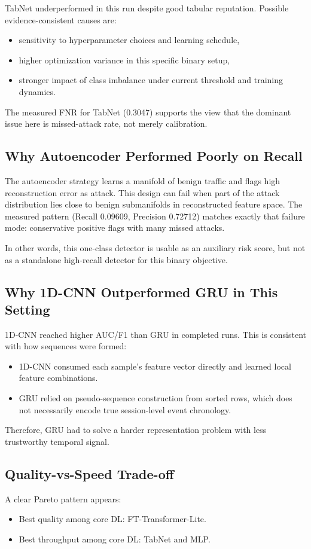 \documentclass[10pt,journal]{IEEEtran}
\begin{document}
TabNet underperformed in this run despite good tabular reputation. Possible evidence-consistent causes are:
\begin{itemize}
\item sensitivity to hyperparameter choices and learning schedule,
\item higher optimization variance in this specific binary setup,
\item stronger impact of class imbalance under current threshold and training dynamics.
\end{itemize}

The measured FNR for TabNet (0.3047) supports the view that the dominant issue here is missed-attack rate, not merely calibration.

\subsection{Why Autoencoder Performed Poorly on Recall}
The autoencoder strategy learns a manifold of benign traffic and flags high reconstruction error as attack. This design can fail when part of the attack distribution lies close to benign submanifolds in reconstructed feature space. The measured pattern (Recall 0.09609, Precision 0.72712) matches exactly that failure mode: conservative positive flags with many missed attacks.

In other words, this one-class detector is usable as an auxiliary risk score, but not as a standalone high-recall detector for this binary objective.

\subsection{Why 1D-CNN Outperformed GRU in This Setting}
1D-CNN reached higher AUC/F1 than GRU in completed runs. This is consistent with how sequences were formed:
\begin{itemize}
\item 1D-CNN consumed each sample's feature vector directly and learned local feature combinations.
\item GRU relied on pseudo-sequence construction from sorted rows, which does not necessarily encode true session-level event chronology.
\end{itemize}

Therefore, GRU had to solve a harder representation problem with less trustworthy temporal signal.

\subsection{Quality-vs-Speed Trade-off}
A clear Pareto pattern appears:
\begin{itemize}
\item Best quality among core DL: FT-Transformer-Lite.
\item Best throughput among core DL: TabNet and MLP.
\end{itemize}
\end{document}
